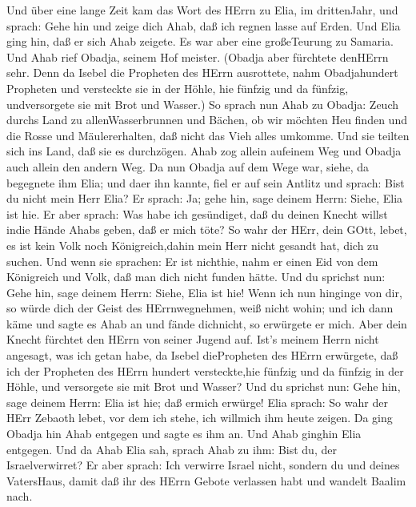  Und über eine lange Zeit kam das Wort des HErrn zu Elia, im
drittenJahr, und sprach: Gehe hin und zeige dich Ahab, daß ich regnen
lasse auf Erden.  Und Elia ging hin, daß er sich Ahab
zeigete. Es war aber eine großeTeurung zu Samaria.  Und Ahab
rief Obadja, seinem Hof meister. (Obadja aber fürchtete denHErrn sehr.
 Denn da Isebel die Propheten des HErrn ausrottete, nahm
Obadjahundert Propheten und versteckte sie in der Höhle, hie fünfzig und
da fünfzig, undversorgete sie mit Brot und Wasser.)  So
sprach nun Ahab zu Obadja: Zeuch durchs Land zu allenWasserbrunnen und
Bächen, ob wir möchten Heu finden und die Rosse und Mäulererhalten, daß
nicht das Vieh alles umkomme.  Und sie teilten sich ins
Land, daß sie es durchzögen. Ahab zog allein aufeinem Weg und Obadja
auch allein den andern Weg.  Da nun Obadja auf dem Wege war,
siehe, da begegnete ihm Elia; und daer ihn kannte, fiel er auf sein
Antlitz und sprach: Bist du nicht mein Herr Elia?  Er
sprach: Ja; gehe hin, sage deinem Herrn: Siehe, Elia ist hie.
 Er aber sprach: Was habe ich gesündiget, daß du deinen
Knecht willst indie Hände Ahabs geben, daß er mich töte? 
So wahr der HErr, dein GOtt, lebet, es ist kein Volk noch
Königreich,dahin mein Herr nicht gesandt hat, dich zu suchen. Und wenn
sie sprachen: Er ist nichthie, nahm er einen Eid von dem Königreich und
Volk, daß man dich nicht funden hätte.  Und du sprichst
nun: Gehe hin, sage deinem Herrn: Siehe, Elia ist hie! 
Wenn ich nun hinginge von dir, so würde dich der Geist des
HErrnwegnehmen, weiß nicht wohin; und ich dann käme und sagte es Ahab an
und fände dichnicht, so erwürgete er mich. Aber dein Knecht fürchtet den
HErrn von seiner Jugend auf.  Ist's meinem Herrn nicht
angesagt, was ich getan habe, da Isebel diePropheten des HErrn
erwürgete, daß ich der Propheten des HErrn hundert versteckte,hie
fünfzig und da fünfzig in der Höhle, und versorgete sie mit Brot und
Wasser?  Und du sprichst nun: Gehe hin, sage deinem Herrn:
Elia ist hie; daß ermich erwürge!  Elia sprach: So wahr der
HErr Zebaoth lebet, vor dem ich stehe, ich willmich ihm heute zeigen.
 Da ging Obadja hin Ahab entgegen und sagte es ihm an. Und
Ahab ginghin Elia entgegen.  Und da Ahab Elia sah, sprach
Ahab zu ihm: Bist du, der Israelverwirret?  Er aber sprach:
Ich verwirre Israel nicht, sondern du und deines VatersHaus, damit daß
ihr des HErrn Gebote verlassen habt und wandelt Baalim nach.
